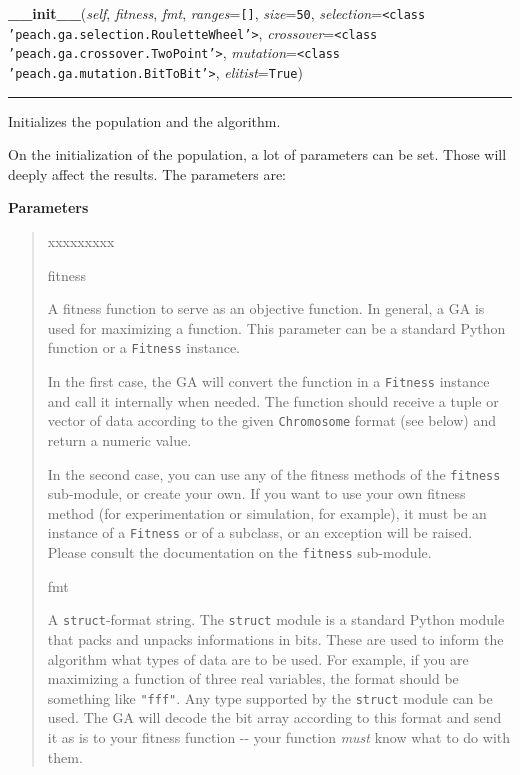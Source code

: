     \begin{boxedminipage}{\textwidth}

    \raggedright \textbf{\_\_init\_\_}(\textit{self}, \textit{fitness}, \textit{fmt}, \textit{ranges}=\texttt{\texttt{[}\texttt{]}}, \textit{size}=\texttt{50}, \textit{selection}=\texttt{{\textless}class 'peach.ga.selection.RouletteWheel'{\textgreater}}, \textit{crossover}=\texttt{{\textless}class 'peach.ga.crossover.TwoPoint'{\textgreater}}, \textit{mutation}=\texttt{{\textless}class 'peach.ga.mutation.BitToBit'{\textgreater}}, \textit{elitist}=\texttt{True})

    \vspace{-1.5ex}

    \rule{\textwidth}{0.5\fboxrule}

Initializes the population and the algorithm.

On the initialization of the population, a lot of parameters can be set.
Those will deeply affect the results. The parameters are:
    \vspace{1ex}

      \textbf{Parameters}
      \begin{quote}
        \begin{Ventry}{xxxxxxxxx}

          \item[fitness]


A fitness function to serve as an objective function. In general, a
GA is used for maximizing a function. This parameter can be a
standard Python function or a \texttt{Fitness} instance.

In the first case, the GA will convert the function in a
\texttt{Fitness} instance and call it internally when needed. The
function should receive a tuple or vector of data according to the
given \texttt{Chromosome} format (see below) and return a numeric value.

In the second case, you can use any of the fitness methods of the
\texttt{fitness} sub-module, or create your own. If you want to use your
own fitness method (for experimentation or simulation, for example),
it must be an instance of a \texttt{Fitness} or of a subclass, or an
exception will be raised. Please consult the documentation on the
\texttt{fitness} sub-module.
          \item[fmt]


A \texttt{struct}-format string. The \texttt{struct} module is a standard
Python module that packs and unpacks informations in bits. These
are used to inform the algorithm what types of data are to be used.
For example, if you are maximizing a function of three real
variables, the format should be something like \texttt{"fff"}. Any type
supported by the \texttt{struct} module can be used. The GA will decode
the bit array according to this format and send it as is to your
fitness function -{}- your function \emph{must} know what to do with them.


\end{Ventry}
\end{quote}
\end{boxedminipage}
